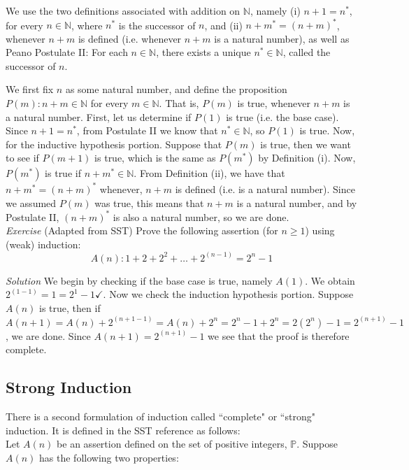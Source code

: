 We use the two definitions associated with addition on $\mathbb{N}$, namely (i) $n+1=n^{*}$, for every $n \in \mathbb{N}$, where $n^{*}$ is the successor of $n$, and (ii) $n+m^{*}=(n+m)^{*}$, whenever $n+m$ is defined (i.e. whenever $n+m$ is a natural number), as well as Peano Postulate II: For each $n \in \mathbb{N}$, there exists a unique $n^{*} \in \mathbb{N}$, called the successor of $n$. 

We first fix $n$ as some natural number, and define the proposition $P(m): n+m \in \mathbb{N}$ for every $m \in \mathbb{N}$.  That is, $P(m)$ is true, whenever $n+m$ is a natural number.  First, let us determine if $P(1)$ is true (i.e. the base case).  Since $n+1=n^{*}$, from Postulate II we know that $n^{*} \in \mathbb{N}$, so $P(1)$ is true.  Now, for the inductive hypothesis portion.  Suppose that $P(m)$ is true, then we want to see if $P(m+1)$ is true, which is the same as $P(m^{*})$ by Definition (i).  Now, $P(m^{*})$ is true if $n+m^{*} \in \mathbb{N}$.  From Definition (ii), we have that $n+m^{*}=(n+m)^{*}$ whenever, $n+m$ is defined (i.e. is a natural number).  Since we assumed $P(m)$ was true, this means that $n+m$ is a natural number, and by Postulate II, $(n+m)^{*}$ is also a natural number, so we are done.\\

\textit{Exercise}  (Adapted from SST) Prove the following assertion (for $n \ge 1$) using (weak) induction:\\
\begin{displaymath}
A(n): 1 + 2 + 2^{2} + \ldots + 2^{(n-1)}=2^{n}-1
\end{displaymath}

\textit{Solution} We begin by checking if the base case is true, namely $A(1)$.  We obtain $2^{(1-1)}=1=2^{1}-1 \checkmark$.  Now we check the induction hypothesis portion.  Suppose $A(n)$ is true, then if $A(n+1)=A(n)+2^{(n+1-1)}=A(n)+2^{n}=2^{n}-1+2^{n}=2(2^{n})-1=2^{(n+1)}-1$, we are done.  Since $A(n+1)=2^{(n+1)}-1$ we see that the proof is therefore complete.

\subsection{Strong Induction}

There is a second formulation of induction called ``complete" or ``strong" induction.  It is defined in the SST reference as follows:\\

Let $A(n)$ be an assertion defined on the set of positive integers, $\mathbb{P}$.  Suppose $A(n)$ has the following two properties:\\

